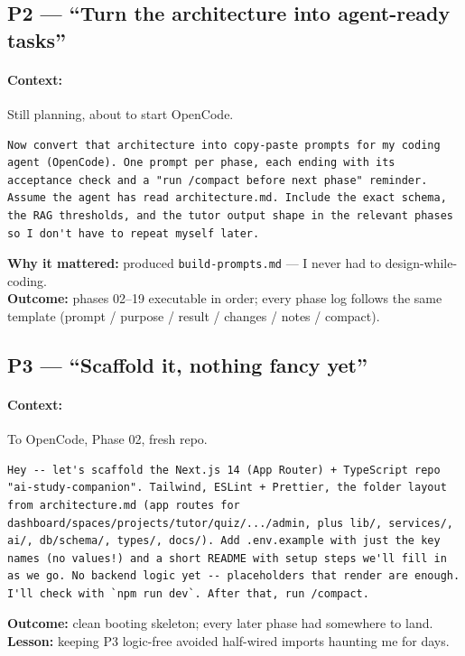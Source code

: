 \documentclass[11pt,a4paper]{article}
\begin{document}
\subsection{P2 --- ``Turn the architecture into agent-ready tasks''}
\paragraph{Context:} Still planning, about to start OpenCode.
\begin{lstlisting}
Now convert that architecture into copy-paste prompts for my coding agent (OpenCode). One prompt per phase, each ending with its acceptance check and a "run /compact before next phase" reminder. Assume the agent has read architecture.md. Include the exact schema, the RAG thresholds, and the tutor output shape in the relevant phases so I don't have to repeat myself later.
\end{lstlisting}
\textbf{Why it mattered:} produced \texttt{build-prompts.md} --- I never had to design-while-coding.\\
\textbf{Outcome:} phases 02--19 executable in order; every phase log follows the same template (prompt / purpose / result / changes / notes / compact).

\subsection{P3 --- ``Scaffold it, nothing fancy yet''}
\paragraph{Context:} To OpenCode, Phase 02, fresh repo.
\begin{lstlisting}
Hey -- let's scaffold the Next.js 14 (App Router) + TypeScript repo "ai-study-companion". Tailwind, ESLint + Prettier, the folder layout from architecture.md (app routes for dashboard/spaces/projects/tutor/quiz/.../admin, plus lib/, services/, ai/, db/schema/, types/, docs/). Add .env.example with just the key names (no values!) and a short README with setup steps we'll fill in as we go. No backend logic yet -- placeholders that render are enough. I'll check with `npm run dev`. After that, run /compact.
\end{lstlisting}
\textbf{Outcome:} clean booting skeleton; every later phase had somewhere to land.\\
\textbf{Lesson:} keeping P3 logic-free avoided half-wired imports haunting me for days.

\end{document}
